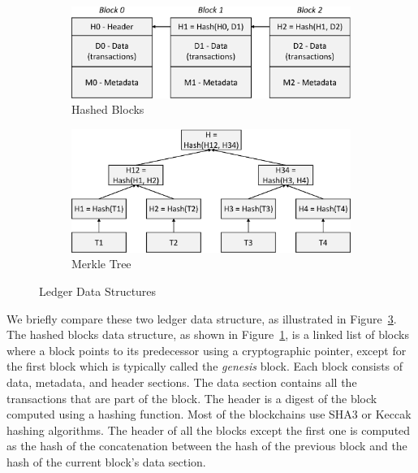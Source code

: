 \documentclass[11pt]{article}
\begin{document}
\begin{figure}[tp]
	\centering
	\begin{subfigure}{0.48\textwidth}
	\includegraphics[width=\textwidth]{figs/blocks_diagrams.eps}
	\caption{Hashed Blocks}
	\label{fig:blocks}    
	\end{subfigure}
	\quad
	\begin{subfigure}{0.48\textwidth}
	\includegraphics[width=\textwidth]{figs/merkle_diagram.eps}
	\caption{Merkle Tree}
	\label{fig:merkle}  
	\end{subfigure}
	\caption{Ledger Data Structures}
    \label{fig:ledgers}    
\end{figure}

We briefly compare these two ledger data structure, as illustrated in
Figure~\ref{fig:ledgers}. The hashed blocks data structure, as shown in
Figure~\ref{fig:blocks}, is a linked list of blocks where a block points to its
predecessor using a cryptographic pointer, except for the first block which is
typically called the \textit{genesis} block. Each block consists of data,
metadata, and header sections. The data section contains all the transactions
that are part of the block. The header is a digest of the block computed using a
hashing function. Most of the blockchains use SHA3 or Keccak hashing algorithms.
The header of all the blocks except the first one is computed as the hash of the
concatenation between the hash of the previous block and the hash of the current
block's data section.
\end{document}

